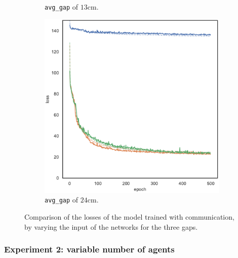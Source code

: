 \begin{figure}[!htb]
\begin{center}
\begin{subfigure}[h]{0.32\textwidth}
			\caption{\texttt{avg\_gap} of $13$\gls{cm}.}
		\end{subfigure}
		\hfill
		\begin{subfigure}[h]{0.32\textwidth}
			\includegraphics[width=\textwidth]{contents/images/task1-comm/loss-communication-gap_24@copy}
			\caption{\texttt{avg\_gap} of $24$\gls{cm}.}
		\end{subfigure}
	\end{center}
	\vspace{-0.5cm}
	\caption[Losses summary of the first set of experiments 
	(communication).]{Comparison of the losses of the model trained with 
		communication, by varying the input of the networks for the three gaps.}
	\label{fig:commloss81324}
\end{figure}

\subsubsection{Experiment 2: variable number of agents}
\label{subsubsec:task1-exp-comm-2}

